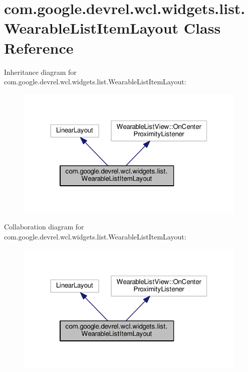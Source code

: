 \hypertarget{classcom_1_1google_1_1devrel_1_1wcl_1_1widgets_1_1list_1_1WearableListItemLayout}{}\section{com.\+google.\+devrel.\+wcl.\+widgets.\+list.\+Wearable\+List\+Item\+Layout Class Reference}
\label{classcom_1_1google_1_1devrel_1_1wcl_1_1widgets_1_1list_1_1WearableListItemLayout}


Inheritance diagram for com.\+google.\+devrel.\+wcl.\+widgets.\+list.\+Wearable\+List\+Item\+Layout\+:
\nopagebreak
\begin{figure}[H]
\begin{center}
\leavevmode
\includegraphics[width=314pt]{d3/de8/classcom_1_1google_1_1devrel_1_1wcl_1_1widgets_1_1list_1_1WearableListItemLayout__inherit__graph}
\end{center}
\end{figure}


Collaboration diagram for com.\+google.\+devrel.\+wcl.\+widgets.\+list.\+Wearable\+List\+Item\+Layout\+:
\nopagebreak
\begin{figure}[H]
\begin{center}
\leavevmode
\includegraphics[width=314pt]{d8/dfc/classcom_1_1google_1_1devrel_1_1wcl_1_1widgets_1_1list_1_1WearableListItemLayout__coll__graph}
\end{center}
\end{figure}
